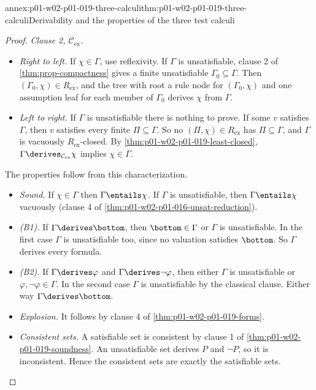 \begin{annexitem}{annex:p01-w02-p01-019-three-calculi}{thm:p01-w02-p01-019-three-calculi}{Derivability and the properties of the three test calculi}
\begin{proof}
\emph{Clause 2, \(\mathcal C_{\mathrm{ex}}\).}
\begin{itemize}
  \item \emph{Right to left.} If \(\chi\in\Gamma\), use reflexivity. If
        \(\Gamma\) is unsatisfiable, clause 2 of
        \cref{thm:prop-compactness} gives a finite unsatisfiable
        \(\Gamma_0\subseteq\Gamma\). Then
        \((\Gamma_0,\chi)\in R_{\mathrm{ex}}\), and the tree with root a rule
        node for \((\Gamma_0,\chi)\) and one assumption leaf for each member
        of \(\Gamma_0\) derives \(\chi\) from \(\Gamma\).
  \item \emph{Left to right.} If \(\Gamma\) is unsatisfiable there is
        nothing to prove. If some \(v\) satisfies \(\Gamma\), then \(v\)
        satisfies every finite \(\Pi\subseteq\Gamma\). So no
        \((\Pi,\chi)\in R_{\mathrm{ex}}\) has \(\Pi\subseteq\Gamma\), and
        \(\Gamma\) is vacuously \(R_{\mathrm{ex}}\)-closed. By
        \cref{thm:p01-w02-p01-019-least-closed},
        \(\Gamma\derives_{\mathcal C_{\mathrm{ex}}}\chi\) implies
        \(\chi\in\Gamma\).
\end{itemize}
The properties follow from this characterization.
\begin{itemize}
  \item \emph{Sound.} If \(\chi\in\Gamma\) then \(\Gamma\entails\chi\). If
        \(\Gamma\) is unsatisfiable, then \(\Gamma\entails\chi\) vacuously
        (clause 4 of \cref{thm:p01-w02-p01-016-unsat-reduction}).
  \item \emph{(B1).} If \(\Gamma\derives\bottom\), then \(\bottom\in\Gamma\)
        or \(\Gamma\) is unsatisfiable. In the first case \(\Gamma\) is
        unsatisfiable too, since no valuation satisfies \(\bottom\). So
        \(\Gamma\) derives every formula.
  \item \emph{(B2).} If \(\Gamma\derives\varphi\) and
        \(\Gamma\derives\neg\varphi\), then either \(\Gamma\) is
        unsatisfiable or \(\varphi,\neg\varphi\in\Gamma\). In the second
        case \(\Gamma\) is unsatisfiable by the classical clause. Either
        way \(\Gamma\derives\bottom\).
  \item \emph{Explosion.} It follows by clause 4 of
        \cref{thm:p01-w02-p01-019-forms}.
  \item \emph{Consistent sets.} A satisfiable set is consistent by clause 1
        of \cref{thm:p01-w02-p01-019-soundness}. An unsatisfiable set
        derives \(P\) and \(\neg P\), so it is inconsistent. Hence the
        consistent sets are exactly the satisfiable sets.

\end{itemize}
\end{proof}
\end{annexitem}
